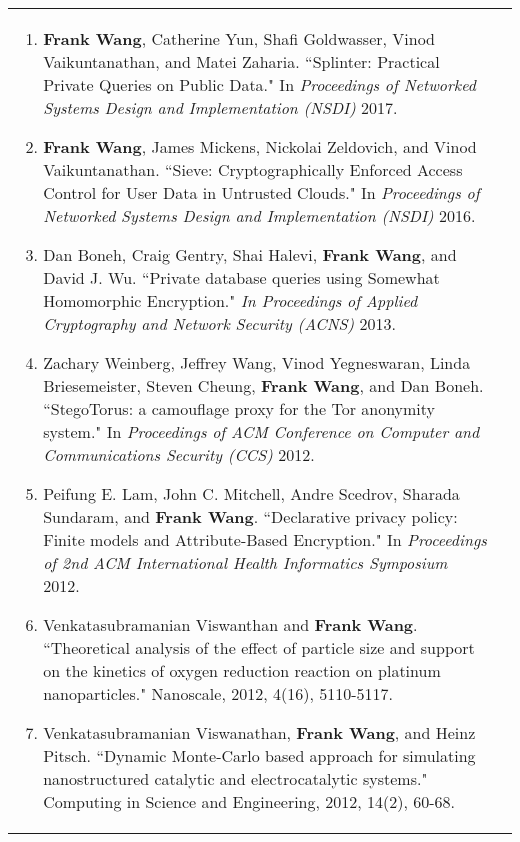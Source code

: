 \documentclass[a4paper,10pt]{article}
\begin{document}
\begin{longtable}{ p{0.9in} l }
\begin{minipage}[t]{0.78 \textwidth}
\begin{enumerate}[leftmargin=*]
\item{\textbf{Frank Wang}, Catherine Yun, Shafi Goldwasser, Vinod Vaikuntanathan, and Matei Zaharia. ``Splinter: Practical Private Queries on Public Data." In \textit{Proceedings of Networked Systems Design and Implementation (NSDI)} 2017.}

\item{\textbf{Frank Wang}, James Mickens, Nickolai Zeldovich, and  Vinod Vaikuntanathan. ``Sieve: Cryptographically Enforced Access Control for User Data in Untrusted Clouds." In \textit{Proceedings of Networked Systems Design and Implementation (NSDI)} 2016.}
               
\item{Dan Boneh, Craig Gentry, Shai Halevi, \textbf{Frank Wang}, and David J. Wu. ``Private database queries using Somewhat Homomorphic Encryption." \textit{In Proceedings of Applied Cryptography and Network Security (ACNS)} 2013.}

\item{Zachary Weinberg, Jeffrey Wang, Vinod Yegneswaran, Linda Briesemeister, Steven Cheung, \textbf{Frank Wang}, and Dan Boneh. ``StegoTorus: a camouflage proxy for the Tor anonymity system." In \textit{Proceedings of ACM Conference on Computer and Communications Security (CCS)} 2012.}

\item{Peifung E. Lam, John C. Mitchell, Andre Scedrov, Sharada Sundaram, and \textbf{Frank Wang}. ``Declarative privacy policy: Finite models and Attribute-Based Encryption." In \textit{Proceedings of 2nd ACM International Health Informatics Symposium} 2012.}

\item{Venkatasubramanian Viswanthan and \textbf{Frank Wang}. ``Theoretical analysis of the effect of particle size and support on the kinetics of oxygen reduction reaction on platinum nanoparticles." Nanoscale, 2012, 4(16), 5110-5117.}

\item{Venkatasubramanian Viswanathan, \textbf{Frank Wang}, and Heinz Pitsch. ``Dynamic Monte-Carlo based approach for simulating nanostructured catalytic and electrocatalytic systems." Computing in Science and Engineering, 2012, 14(2), 60-68.}

\end{enumerate}
\end{minipage} \tabularnewline

\end{longtable} 
\end{document}
